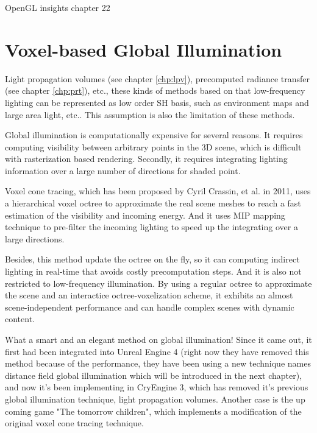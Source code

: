 OpenGL insights chapter 22



\chapter{Voxel-based Global Illumination}
Light propagation volumes (see chapter \ref{chp:lpv}), precomputed radiance transfer (see chapter \ref{chp:prt}), etc., these kinds of methods based on that low-frequency lighting can be represented as low order SH basis, such as environment maps and large area light, etc.. This assumption is also the limitation of these methods.

Global illumination is computationally expensive for several reasons. It requires computing visibility between arbitrary points in the 3D scene, which is difficult with rasterization based rendering. Secondly, it requires integrating lighting information over a large number of directions for shaded point.

Voxel cone tracing, which has been proposed by Cyril Crassin\cite{a:InteractiveIndirectIlluminationUsingVoxelConeTracing}, et al. in 2011, uses a hierarchical voxel octree to approximate the real scene meshes to reach a fast estimation of the visibility and incoming energy. And it uses MIP mapping technique to pre-filter the incoming lighting to speed up the integrating over a large directions. 

Besides, this method update the octree on the fly, so it can computing indirect lighting in real-time that avoids costly precomputation steps. And it is also not restricted to low-frequency illumination. By using a regular octree to approximate the scene and an interactice octree-voxelization scheme, it exhibits an almost scene-independent performance and can handle complex scenes with dynamic content.

What a smart and an elegant method on global illumination! Since it came out, it first had been integrated into Unreal Engine 4\cite{a:TheTechnologyBehindtheUnrealEngine4Elementaldemo} (right now they have removed this method because of the performance, they have been using a new technique names distance field global illumination which will be introduced in the next chapter), and now it's been implementing in CryEngine 3, which has removed it's previous global illumination technique, light propagation volumes. Another case is the up coming game "The tomorrow children"\cite{a:TheTechnologyofTheTomorrowChildren}, which implements a modification of the original voxel cone tracing technique.





